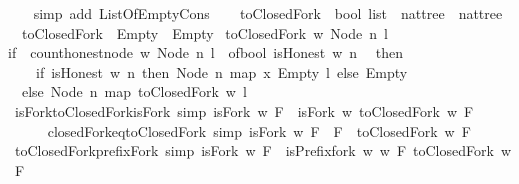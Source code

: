 \begin{isabellebody}
\ \ \isamarkupfalse%
\ {\isacharparenleft}simp\ add{\isacharcolon}\ ListOfEmpty{\isachardot}Cons{\isacharparenright}%
\endisatagproof
{\isafoldproof}%
%
\isadelimproof
\isanewline
%
\endisadelimproof
\ \ \isanewline
\isanewline
{}\isamarkupfalse%
\ toClosedFork\ {\isacharcolon}{\isacharcolon}\ {\isachardoublequoteopen}bool\ list\ {\isasymRightarrow}\ nattree\ {\isasymRightarrow}\ nattree{\isachardoublequoteclose}\ \isanewline
\ \ {\isachardoublequoteopen}toClosedFork\ {\isacharunderscore}\ Empty\ {\isacharequal}\ Empty{\isachardoublequoteclose}\isanewline
{\isacharbar}\ {\isachardoublequoteopen}toClosedFork\ w\ {\isacharparenleft}Node\ n\ l{\isacharparenright}\ {\isacharequal}\isanewline
{\isacharparenleft}if\ \ count{\isacharunderscore}honest{\isacharunderscore}node\ w\ {\isacharparenleft}Node\ n\ l{\isacharparenright}\ {\isacharequal}\ of{\isacharunderscore}bool\ {\isacharparenleft}isHonest\ w\ n{\isacharparenright}\isanewline
\ \ then\ \isanewline
\ \ \ \ {\isacharparenleft}if\ isHonest\ w\ n\ then\ Node\ n\ {\isacharparenleft}map\ {\isacharparenleft}{\isasymlambda}x{\isachardot}\ Empty{\isacharparenright}\ l{\isacharparenright}\ else\ Empty{\isacharparenright}\isanewline
\ \ else\ Node\ n\ {\isacharparenleft}map\ {\isacharparenleft}toClosedFork\ w{\isacharparenright}\ l{\isacharparenright}\isanewline
{\isacharparenright}{\isachardoublequoteclose}\isanewline
\isanewline
{}\isamarkupfalse%
\ isFork{\isacharunderscore}toClosedFork{\isacharunderscore}isFork\ {\isacharbrackleft}simp{\isacharbrackright}{\isacharcolon}\ {\isachardoublequoteopen}isFork\ w\ F\ {\isasymlongrightarrow}\ isFork\ w\ {\isacharparenleft}toClosedFork\ w\ F{\isacharparenright}{\isachardoublequoteclose}\isanewline
%
\isadelimproof
\ \ %
\endisadelimproof
%
\isatagproof
{}\isamarkupfalse%
%
\endisatagproof
{\isafoldproof}%
%
\isadelimproof
\isanewline
%
\endisadelimproof
\ \ \ \ \isanewline
{}\isamarkupfalse%
\ closedFork{\isacharunderscore}eq{\isacharunderscore}toClosedFork\ {\isacharbrackleft}simp{\isacharbrackright}{\isacharcolon}\ {\isachardoublequoteopen}isFork\ w\ F\ {\isasymlongrightarrow}\ F\ {\isacharequal}\ {\isacharparenleft}toClosedFork\ w\ F{\isacharparenright}{\isachardoublequoteclose}\isanewline
%
\isadelimproof
\ \ %
\endisadelimproof
%
\isatagproof
{}\isamarkupfalse%
%
\endisatagproof
{\isafoldproof}%
%
\isadelimproof
\ \isanewline
%
\endisadelimproof
\isanewline
{}\isamarkupfalse%
\ toClosedFork{\isacharunderscore}prefixFork\ {\isacharbrackleft}simp{\isacharbrackright}{\isacharcolon}\ {\isachardoublequoteopen}isFork\ w\ F\ {\isasymlongrightarrow}\ isPrefix{\isacharunderscore}fork\ w\ w\ F\ {\isacharparenleft}toClosedFork\ w\ F{\isacharparenright}{\isachardoublequoteclose}\isanewline

\end{isabellebody}

